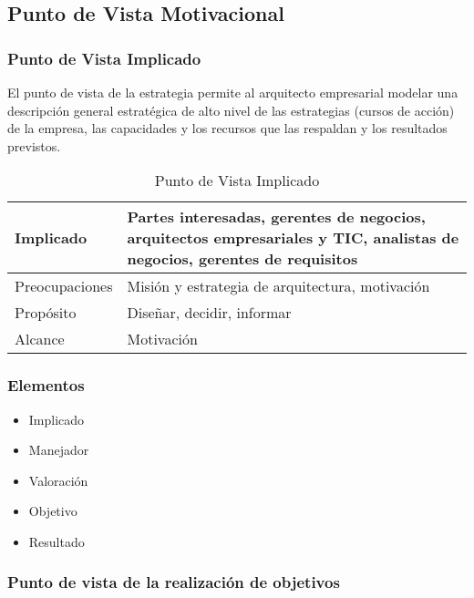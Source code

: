 \subsection{Punto de Vista Motivacional}

\subsubsection{Punto de Vista Implicado}

El punto de vista de la estrategia permite al arquitecto empresarial modelar una descripción general estratégica de alto nivel de las estrategias (cursos de acción) de la empresa, las capacidades y los recursos que las respaldan y los resultados previstos.
\begin{table}[ht]
	
	\begin{center}
		\begin{tabular}{ | m{6em} | m{8cm}|  } 
			
			\hline
			Implicado & Partes interesadas, gerentes de negocios, arquitectos empresariales y TIC, analistas de negocios, gerentes de requisitos 
			\\
			\hline
			Preocupaciones & Misión y estrategia de arquitectura, motivación
			\\
			\hline
			Propósito & Diseñar, decidir, informar
			\\
			\hline
			Alcance & Motivación
			\\
			\hline
		\end{tabular}
		\caption{Punto de Vista Implicado}
		\label{tab:concepts}
	\end{center}
\end{table}

\subsubsection{Elementos}
\begin{itemize}
	\item Implicado
	\item Manejador
	\item Valoración
	\item Objetivo
	\item Resultado
\end{itemize}

\subsubsection{Punto de vista de la realización de objetivos}



